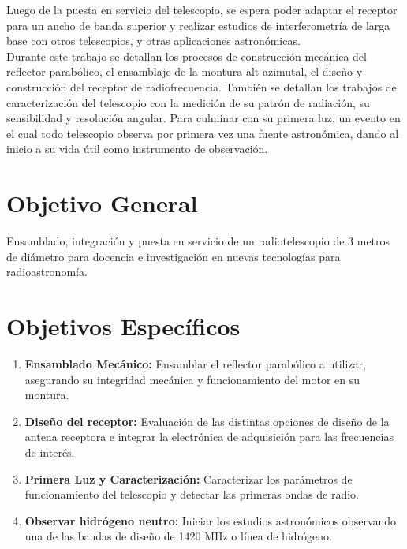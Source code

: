 Luego de la puesta en servicio del telescopio, se espera poder adaptar el receptor para un ancho de banda superior y realizar estudios de interferometría de larga base con otros telescopios, y otras aplicaciones astronómicas.\\

Durante este trabajo se detallan los procesos de construcción mecánica del reflector parabólico, el ensamblaje de la montura alt azimutal, el diseño y construcción del receptor de radiofrecuencia. También se detallan los trabajos de caracterización del telescopio con la medición de su patrón de radiación, su sensibilidad y resolución angular. Para culminar con su primera luz, un evento en el cual todo telescopio observa por primera vez una fuente astronómica, dando al inicio a su vida útil como instrumento de observación.\\


\section{Objetivo General}
Ensamblado, integración y puesta en servicio de un radiotelescopio de 3 metros de diámetro para docencia e investigación en nuevas tecnologías para radioastronomía.

\section{Objetivos Específicos}

\begin{enumerate}
    \item \textbf{Ensamblado Mecánico:} Ensamblar el reflector parabólico a utilizar, asegurando su integridad mecánica y funcionamiento del motor en su montura.
    \item \textbf{Diseño del receptor:} Evaluación de las distintas opciones de diseño de la antena receptora e integrar la electrónica de adquisición para las frecuencias de interés.
    \item \textbf{Primera Luz y Caracterización:} Caracterizar los parámetros de funcionamiento del telescopio y detectar las primeras ondas de radio.
    \item \textbf{Observar hidrógeno neutro:} Iniciar los estudios astronómicos observando una de las bandas de diseño de 1420 MHz o línea de hidrógeno.

\end{enumerate}



